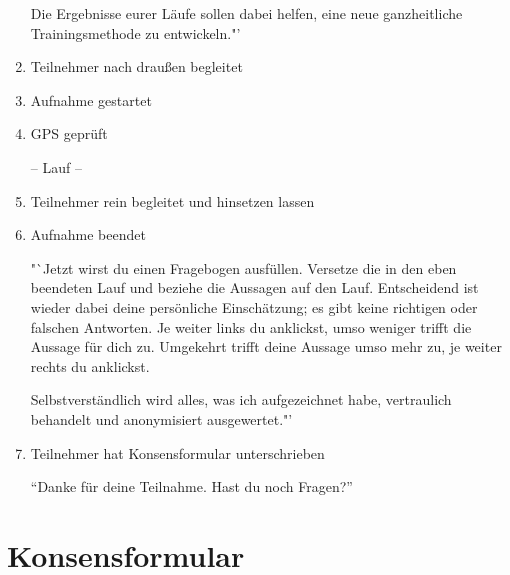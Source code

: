 \begin{enumerate}
	Die Ergebnisse eurer Läufe sollen dabei helfen, eine neue ganzheitliche Trainingsmethode zu entwickeln."'
	
	\item Teilnehmer nach draußen begleitet 
	\item Aufnahme gestartet 
	\item \acs{GPS} geprüft
	
	-- Lauf --
	
	\item Teilnehmer rein begleitet und hinsetzen lassen 
	\item Aufnahme beendet
	
	"`Jetzt wirst du einen Fragebogen ausfüllen. Versetze die in den eben beendeten Lauf und beziehe die Aussagen auf den Lauf. Entscheidend ist wieder dabei deine persönliche Einschätzung; es gibt keine richtigen oder falschen Antworten. Je weiter links du anklickst, umso weniger trifft die Aussage für dich zu. Umgekehrt trifft deine Aussage umso mehr zu, je weiter rechts du anklickst.
	
	Selbstverständlich wird alles, was ich aufgezeichnet habe, vertraulich behandelt und anonymisiert ausgewertet."'
	
	\item Teilnehmer hat Konsensformular unterschrieben
	
	"`Danke für deine Teilnahme. Hast du noch Fragen?"' 
\end{enumerate}
\newpage

\section{Konsensformular} 

\label{sec:konsensformular}

